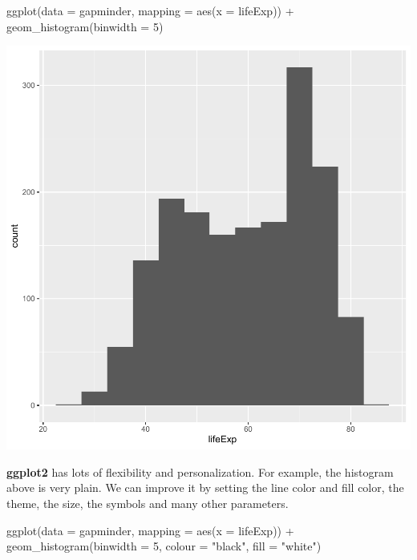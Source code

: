 \documentclass[
]{book}
\makeatletter
\newenvironment{Shaded}{\begin{snugshade}}{\end{snugshade}}
\newcommand{\AttributeTok}[1]{\textcolor[rgb]{0.61,0.61,0.61}{#1}}
\newcommand{\DecValTok}[1]{\textcolor[rgb]{0.06,0.06,0.06}{#1}}
\newcommand{\FunctionTok}[1]{\textcolor[rgb]{0,0,0}{#1}}
\newcommand{\NormalTok}[1]{#1}
\newcommand{\SpecialCharTok}[1]{\textcolor[rgb]{0,0,0}{#1}}
\newcommand{\StringTok}[1]{\textcolor[rgb]{0.5,0.5,0.5}{#1}}
\newenvironment{kframe}{%
\medskip{}
\setlength{\fboxsep}{.8em}
 \def\at@end@of@kframe{}%
 \ifinner\ifhmode%
  \def\at@end@of@kframe{\end{minipage}}%
  \begin{minipage}{\columnwidth}%
 \fi\fi%
 \def\FrameCommand##1{\hskip\@totalleftmargin \hskip-\fboxsep
 \colorbox{shadecolor}{##1}\hskip-\fboxsep
     \hskip-\linewidth \hskip-\@totalleftmargin \hskip\columnwidth}%
 \MakeFramed {\advance\hsize-\width
   \@totalleftmargin\z@ \linewidth\hsize
   \@setminipage}}%
 {\par\unskip\endMakeFramed%
 \at@end@of@kframe}
\renewenvironment{Shaded}{\begin{kframe}}{\end{kframe}}
\makeatother
\begin{document}
\begin{Shaded}
\begin{Highlighting}[]
\FunctionTok{ggplot}\NormalTok{(}\AttributeTok{data =}\NormalTok{ gapminder, }\AttributeTok{mapping =} \FunctionTok{aes}\NormalTok{(}\AttributeTok{x =}\NormalTok{ lifeExp)) }\SpecialCharTok{+} 
  \FunctionTok{geom\_histogram}\NormalTok{(}\AttributeTok{binwidth =} \DecValTok{5}\NormalTok{)}
\end{Highlighting}
\end{Shaded}

\begin{center}\includegraphics[width=0.7\linewidth,keepaspectratio]{Multivariable_Data_Analysis_files/figure-latex/unnamed-chunk-74-1} \end{center}

\textbf{ggplot2} has lots of flexibility and personalization. For example, the histogram above is very plain. We can improve it by setting the line color and fill color, the theme, the size, the symbols and many other parameters.

\begin{Shaded}
\begin{Highlighting}[]
\FunctionTok{ggplot}\NormalTok{(}\AttributeTok{data =}\NormalTok{ gapminder, }\AttributeTok{mapping =} \FunctionTok{aes}\NormalTok{(}\AttributeTok{x =}\NormalTok{ lifeExp)) }\SpecialCharTok{+} 
  \FunctionTok{geom\_histogram}\NormalTok{(}\AttributeTok{binwidth =} \DecValTok{5}\NormalTok{, }\AttributeTok{colour =} \StringTok{"black"}\NormalTok{, }\AttributeTok{fill =} \StringTok{"white"}\NormalTok{)}
\end{Highlighting}
\end{Shaded}
\end{document}
